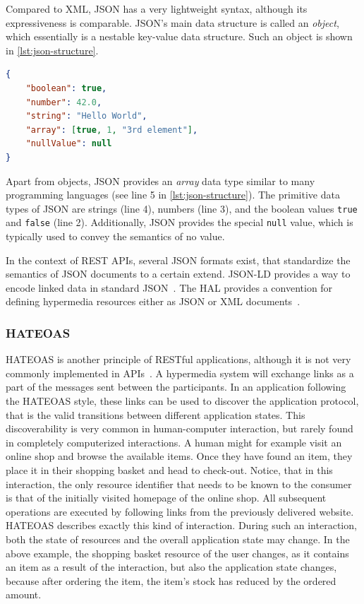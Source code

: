 Compared to \ac{XML}, \ac{JSON} has a very lightweight syntax, although its expressiveness is comparable.
\ac{JSON}'s main data structure is called an \textit{object}, which essentially is a nestable key-value data structure.
Such an object is shown in \autoref{lst:json-structure}.

\begin{lstlisting}[caption={\acs{JSON} Data Types and Structures}, label=lst:json-structure, language=json]
{
    "boolean": true,
    "number": 42.0,
    "string": "Hello World",
    "array": [true, 1, "3rd element"],
    "nullValue": null
}
\end{lstlisting}

Apart from objects, \ac{JSON} provides an \textit{array} data type similar to many programming languages (see line 5 in \autoref{lst:json-structure}).
The primitive data types of \ac{JSON} are strings (line 4), numbers (line 3), and the boolean values \texttt{true} and \texttt{false} (line 2).
Additionally, \ac{JSON} provides the special \texttt{null} value, which is typically used to convey the semantics of no value.

In the context of \ac{REST} \acp{API}, several \ac{JSON} formats exist, that standardize the semantics of \ac{JSON} documents to a certain extend.
JSON-LD provides a way to encode linked data in standard \ac{JSON}~\cite{Kellogg2020}.
The \ac{HAL} provides a convention for defining hypermedia resources either as \ac{JSON} or \ac{XML} documents~\cite{HALdraft}.

\subsubsection{\acf{HATEOAS}}

\ac{HATEOAS} is another principle of \ac{REST}ful applications, although it is not very commonly implemented in \acp{API}~\cite{Liskin2011,Webber2010}.
A hypermedia system will exchange links as a part of the messages sent between the participants.
In an application following the \ac{HATEOAS} style, these links can be used to discover the application protocol, that is the valid transitions between different application states.
This discoverability is very common in human-computer interaction, but rarely found in completely computerized interactions.
A human might for example visit an online shop and browse the available items.
Once they have found an item, they place it in their shopping basket and head to check-out.
Notice, that in this interaction, the only resource identifier that needs to be known to the consumer is that of the initially visited homepage of the online shop.
All subsequent operations are executed by following links from the previously delivered website.
\ac{HATEOAS} describes exactly this kind of interaction.
During such an interaction, both the state of resources and the overall application state may change.
In the above example, the shopping basket resource of the user changes, as it contains an item as a result of the interaction, but also the application state changes, because after ordering the item, the item's stock has reduced by the ordered amount.

